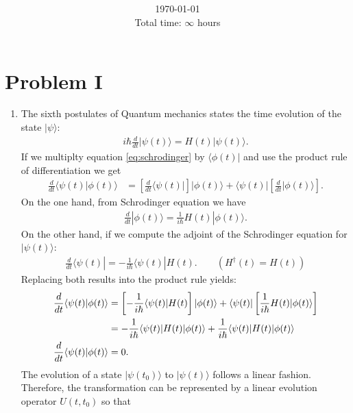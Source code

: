 \documentclass[letterpaper,11pt,twoside]{article}
\title{\textbf{\assignment}\\\course\\{\Large\institution}}
\author{\autor}
\date{\today\\Total time: $\infty$ hours}
\newcommand{\ket}[1]{|#1\rangle}
\newcommand{\bra}[1]{\langle#1|}
\newcommand{\braket}[1]{\langle#1\rangle}
\begin{document}
\pagestyle{mainstyle}
\maketitle

\section*{Problem I}
\begin{enumerate}[itemsep=0pt,topsep=0pt,label=\alph*)]
  \item The sixth postulates of Quantum mechanics states the time evolution of the state $\ket{\psi}$: 
  \begin{align}
    i\hbar\frac{d}{dt}\ket{\psi(t)}=H(t)\ket{\psi(t)}.
    \label{eq:schrodinger}
  \end{align}
  If we multiplty equation \eqref{eq:schrodinger} by $\bra{\phi(t)}$ and use the product rule of differentiation we get 
  \begin{align*}
    \frac{d}{dt}\braket{\psi(t)|\phi(t)}&=\left[\frac{d}{dt}\bra{\psi(t)}\right]\ket{\phi(t)}+\bra{\psi(t)}\left[\frac{d}{dt}\ket{\phi(t)}\right].
  \end{align*}
  On the one hand, from Schrodinger equation we have 
  \begin{align*}
    \frac{d}{dt}\ket{\phi(t)}=\frac{1}{i\hbar}H(t)\ket{\phi(t)}.
  \end{align*}
  On the other hand, if we compute the adjoint of the Schrodinger equation for $\ket{\psi(t)}$:
  \begin{align*}
    \frac{d}{dt}\bra{\psi(t)}=-\frac{1}{i\hbar}\bra{\psi(t)}H(t).\qquad(H^\dagger(t)=H(t))
  \end{align*}
  Replacing both results into the product rule yields:
  \begin{align}
    \frac{d}{dt}\braket{\psi(t)|\phi(t)}&=\left[-\frac{1}{i\hbar}\bra{\psi(t)}H(t)\right]\ket{\phi(t)}+\bra{\psi(t)}\left[\frac{1}{i\hbar}H(t)\ket{\phi(t)}\right]\notag\\
    &=-\frac{1}{i\hbar}\braket{\psi(t)|H(t)|\phi(t)}+\frac{1}{i\hbar}\braket{\psi(t)|H(t)|\phi(t)}\label{eq:interproblem1}\\
    \frac{d}{dt}\braket{\psi(t)|\phi(t)}&=0.\notag
  \end{align}
  The evolution of a state $\ket{\psi(t_0)}$ to $\ket{\psi(t)}$ follows a linear fashion. Therefore, the transformation can be represented by a linear evolution operator 
  $U(t,t_0)$ so that 
  \begin{align}

\end{align}
\end{enumerate}
\end{document}
